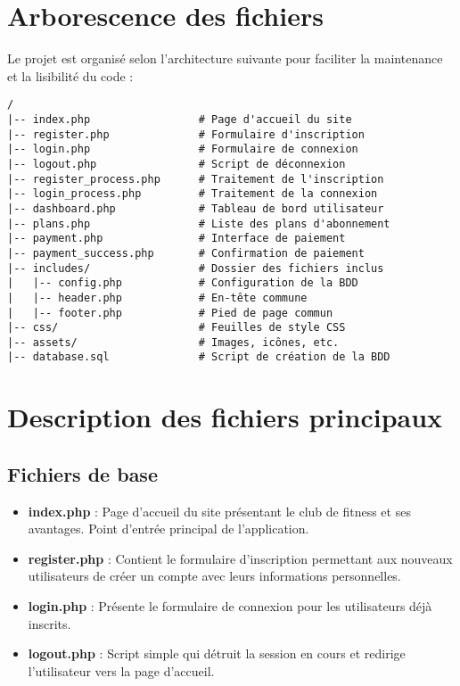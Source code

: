 \documentclass[12pt,a4paper]{report}
\begin{document}
\section{Arborescence des fichiers}
Le projet est organisé selon l'architecture suivante pour faciliter la maintenance et la lisibilité du code :

\begin{lstlisting}[frame=single]
/
|-- index.php                 # Page d'accueil du site
|-- register.php              # Formulaire d'inscription
|-- login.php                 # Formulaire de connexion
|-- logout.php                # Script de déconnexion
|-- register_process.php      # Traitement de l'inscription
|-- login_process.php         # Traitement de la connexion
|-- dashboard.php             # Tableau de bord utilisateur
|-- plans.php                 # Liste des plans d'abonnement
|-- payment.php               # Interface de paiement
|-- payment_success.php       # Confirmation de paiement
|-- includes/                 # Dossier des fichiers inclus
|   |-- config.php            # Configuration de la BDD
|   |-- header.php            # En-tête commune
|   |-- footer.php            # Pied de page commun
|-- css/                      # Feuilles de style CSS
|-- assets/                   # Images, icônes, etc.
|-- database.sql              # Script de création de la BDD
\end{lstlisting}

\section{Description des fichiers principaux}

\subsection{Fichiers de base}
\begin{itemize}
    \item \textbf{index.php} : Page d'accueil du site présentant le club de fitness et ses avantages. Point d'entrée principal de l'application.
    
    \item \textbf{register.php} : Contient le formulaire d'inscription permettant aux nouveaux utilisateurs de créer un compte avec leurs informations personnelles.
    
    \item \textbf{login.php} : Présente le formulaire de connexion pour les utilisateurs déjà inscrits.
    
    \item \textbf{logout.php} : Script simple qui détruit la session en cours et redirige l'utilisateur vers la page d'accueil.
\end{itemize}
\end{document}
